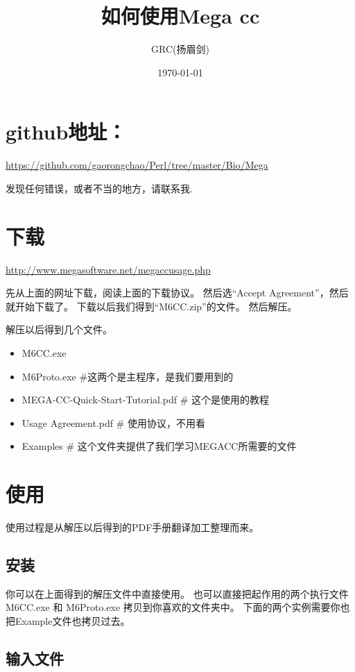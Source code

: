 \documentclass{ctexart}
\title{如何使用Mega cc}
\author{GRC(扬眉剑)}
\date{\today}
\begin{document}
\maketitle

\setcounter{tocdepth}{3}
\tableofcontents
\vspace*{1cm}
\section{github地址：}
\label{sec-1}

\href{https://github.com/gaorongchao/Perl/tree/master/Bio/Mega}{https://github.com/gaorongchao/Perl/tree/master/Bio/Mega}

发现任何错误，或者不当的地方，请联系我.
\section{下载}
\label{sec-2}

\href{http://www.megasoftware.net/megaccusage.php}{http://www.megasoftware.net/megaccusage.php}

先从上面的网址下载，阅读上面的下载协议。
然后选“Accept Agreement”，然后就开始下载了。
下载以后我们得到“M6CC.zip”的文件。
然后解压。

解压以后得到几个文件。
\begin{itemize}
\item M6CC.exe
\item M6Proto.exe \#这两个是主程序，是我们要用到的
\item MEGA-CC-Quick-Start-Tutorial.pdf \# 这个是使用的教程
\item Usage Agreement.pdf \# 使用协议，不用看
\item Examples \# 这个文件夹提供了我们学习MEGACC所需要的文件
\end{itemize}
\section{使用}
\label{sec-3}

使用过程是从解压以后得到的PDF手册翻译加工整理而来。
\subsection{安装}
\label{sec-3-1}

你可以在上面得到的解压文件中直接使用。
也可以直接把起作用的两个执行文件M6CC.exe 和 M6Proto.exe
拷贝到你喜欢的文件夹中。
下面的两个实例需要你也把Example文件也拷贝过去。
\subsection{输入文件}
\label{sec-3-2}
\end{document}
